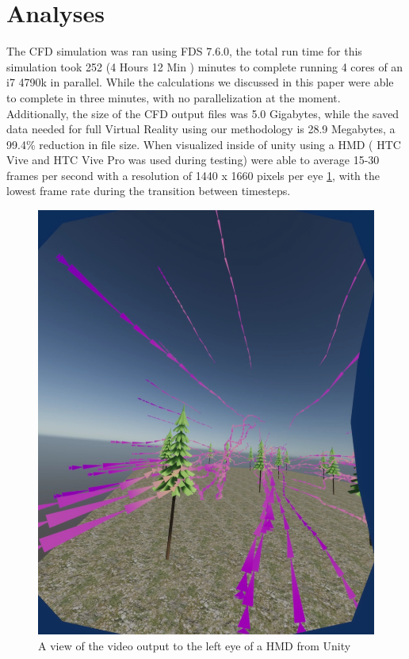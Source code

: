 \section{Analyses}
The CFD simulation was ran  using FDS 7.6.0, the total run time for this simulation took 252 (4 Hours 12 Min ) minutes to complete running 4 cores of an i7 4790k in parallel. 
While the calculations we discussed in this paper were able to complete in three minutes, with no parallelization at the moment. 
Additionally, the size of the CFD output files was 5.0 Gigabytes, while the saved data needed for full Virtual Reality using our methodology is 28.9 Megabytes, a 99.4\% reduction in file size. When visualized inside of unity using a HMD ( HTC Vive and HTC Vive Pro was used during testing) were able to average 15-30 frames per second with a resolution of 1440 x 1660 pixels per eye \ref{fig:LeftEye}, with the lowest frame rate during the transition between timesteps.
\begin{figure}
\centering
\includegraphics[scale=.29]{Figures/lefteye.png}
\decoRule
\caption[Unity View of Simulation]{A view of the video output to the left eye of a HMD from Unity}
\label{fig:LeftEye}
\end{figure}

